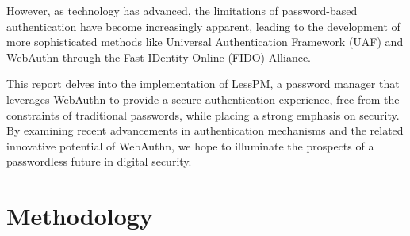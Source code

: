 \documentclass{article}
\begin{document}
    However, as technology has advanced, the limitations of password-based authentication have become increasingly
    apparent, leading to the development of more sophisticated methods like Universal Authentication Framework (UAF) and
    WebAuthn through the Fast IDentity Online (FIDO) Alliance.

    This report delves into the implementation of LessPM, a password manager that leverages WebAuthn to provide a secure
    authentication experience, free from the constraints of traditional passwords, while placing a strong emphasis on
    security.
    By examining recent advancements in authentication mechanisms and the related innovative potential of WebAuthn, we
    hope to illuminate the prospects of a passwordless future in digital security.



    \section*{Methodology}



\end{document}
